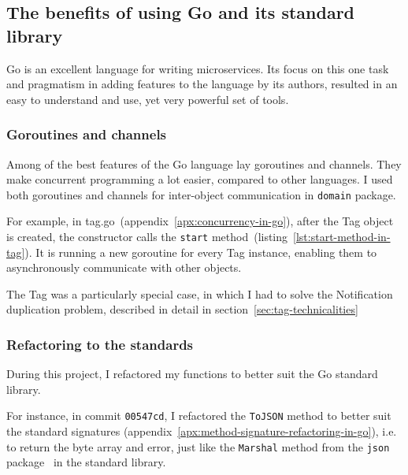 \subsection{The benefits of using Go and its standard library}\label{sec:the-benefits-of-using-go-and-its-standard-library}

Go is an excellent language for writing microservices.
Its focus on this one task
and pragmatism in adding features to the language by its authors,
resulted in an easy to understand and use,
yet very powerful set of tools.

\subsubsection{Goroutines and channels}\label{sec:goroutines-and-channels}

Among of the best features of the Go language lay goroutines and channels.
They make concurrent programming a lot easier, compared to other languages.
I used both goroutines and channels
for inter-object communication in \texttt{domain} package.

For example, in {tag.go}~(appendix~\ref{apx:concurrency-in-go}),
after the Tag object is created,
the constructor calls
the \texttt{start} method~(listing~\ref{lst:start-method-in-tag}).
It is running a new goroutine for every Tag instance,
enabling them to asynchronously communicate with other objects.

The Tag was a particularly special case,
in which I had to solve
the Notification duplication problem,
described in detail in section~\ref{sec:tag-technicalities}

\subsubsection{Refactoring to the standards}\label{sec:refactoring-to-the-standards}

During this project,
I refactored my functions to better suit
the Go standard library.

For instance,
in commit \texttt{00547cd},
I refactored the \texttt{ToJSON} method
to better suit the standard signatures
(appendix~\ref{apx:method-signature-refactoring-in-go}),
i.e. to return the byte array and error,
just like the \texttt{Marshal} method
from the \texttt{json} package~\cite{cox_json_2022}
in the standard library.

